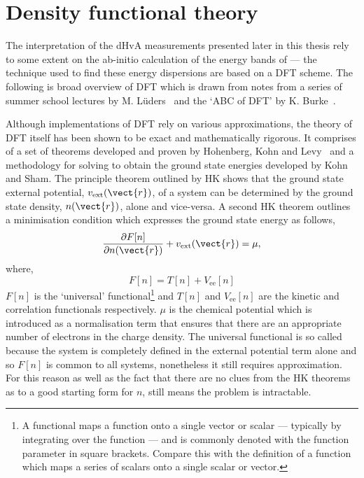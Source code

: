
\section{Density functional theory}
\label{Sec:Theo:Dft}

The interpretation of the \ac{dHvA} measurements presented later in this thesis rely to some extent on the ab-initio calculation of the energy bands of \BaFeP --- the technique used to find these energy dispersions are based on a \ac{DFT} scheme. The following is broad overview of \ac{DFT} which is drawn from notes from a series of summer school lectures by M. L\"uders~\cite{Luders2010} and the `ABC of DFT' by K. Burke~\cite{Burke2003}.

 Although implementations of \ac{DFT} rely on various approximations, the theory of \ac{DFT} itself has been shown to be exact and mathematically rigorous. It comprises of a set of theorems developed and proven by Hohenberg, Kohn and Levy~\cite{Hohenberg1964, Levy1979} and a methodology for solving to obtain the ground state energies developed by Kohn and Sham. The principle theorem outlined by \ac{HK} shows that the ground state external potential, $v_{\textrm{ext}}(\vect{r})$, of a system can be determined by the ground state density, $n(\vect{r})$, alone and vice-versa. A second \ac{HK} theorem outlines a minimisation condition which expresses the ground state energy as follows,
\begin{equation}
\label{Eqn:Theo:HKMinimisation}
\frac{\partial F[n]}{\partial n(\vect{r})} + v_{\textrm{ext}}(\vect{r}) = \mu,
\end{equation}
where,
\begin{equation}
F[n] = T[n] + V_{\textrm{ee}}[n]
\end{equation}
$F[n]$ is the `universal' functional\footnote{A functional maps a function onto a single vector or scalar --- typically by integrating over the function --- and is commonly denoted with the function parameter in square brackets. Compare this with the definition of a function which maps a series of scalars onto a single scalar or vector.} and $T[n]$ and $V_{\textrm{ee}}[n]$ are the kinetic and correlation functionals respectively. $\mu$ is the chemical potential which is introduced as a normalisation term that ensures that there are an appropriate number of electrons in the charge density. The universal functional is so called because the system is completely defined in the external potential term alone and so $F[n]$ is common to all systems, nonetheless it still requires approximation. For this reason as well as the fact that there are no clues from the \ac{HK} theorems as to a good starting form for $n$, still means the problem is intractable.

